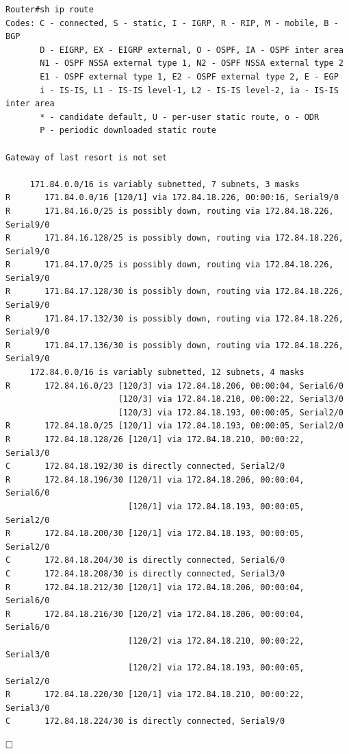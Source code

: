 \documentclass[11pt]{article}
\begin{document}
\begin{enumerate}
\begin{mdframed}
\begin{verbatim}
Router#sh ip route 
Codes: C - connected, S - static, I - IGRP, R - RIP, M - mobile, B - BGP
       D - EIGRP, EX - EIGRP external, O - OSPF, IA - OSPF inter area
       N1 - OSPF NSSA external type 1, N2 - OSPF NSSA external type 2
       E1 - OSPF external type 1, E2 - OSPF external type 2, E - EGP
       i - IS-IS, L1 - IS-IS level-1, L2 - IS-IS level-2, ia - IS-IS inter area
       * - candidate default, U - per-user static route, o - ODR
       P - periodic downloaded static route

Gateway of last resort is not set

     171.84.0.0/16 is variably subnetted, 7 subnets, 3 masks
R       171.84.0.0/16 [120/1] via 172.84.18.226, 00:00:16, Serial9/0
R       171.84.16.0/25 is possibly down, routing via 172.84.18.226, Serial9/0
R       171.84.16.128/25 is possibly down, routing via 172.84.18.226, Serial9/0
R       171.84.17.0/25 is possibly down, routing via 172.84.18.226, Serial9/0
R       171.84.17.128/30 is possibly down, routing via 172.84.18.226, Serial9/0
R       171.84.17.132/30 is possibly down, routing via 172.84.18.226, Serial9/0
R       171.84.17.136/30 is possibly down, routing via 172.84.18.226, Serial9/0
     172.84.0.0/16 is variably subnetted, 12 subnets, 4 masks
R       172.84.16.0/23 [120/3] via 172.84.18.206, 00:00:04, Serial6/0
                       [120/3] via 172.84.18.210, 00:00:22, Serial3/0
                       [120/3] via 172.84.18.193, 00:00:05, Serial2/0
R       172.84.18.0/25 [120/1] via 172.84.18.193, 00:00:05, Serial2/0
R       172.84.18.128/26 [120/1] via 172.84.18.210, 00:00:22, Serial3/0
C       172.84.18.192/30 is directly connected, Serial2/0
R       172.84.18.196/30 [120/1] via 172.84.18.206, 00:00:04, Serial6/0
                         [120/1] via 172.84.18.193, 00:00:05, Serial2/0
R       172.84.18.200/30 [120/1] via 172.84.18.193, 00:00:05, Serial2/0
C       172.84.18.204/30 is directly connected, Serial6/0
C       172.84.18.208/30 is directly connected, Serial3/0
R       172.84.18.212/30 [120/1] via 172.84.18.206, 00:00:04, Serial6/0
R       172.84.18.216/30 [120/2] via 172.84.18.206, 00:00:04, Serial6/0
                         [120/2] via 172.84.18.210, 00:00:22, Serial3/0
                         [120/2] via 172.84.18.193, 00:00:05, Serial2/0
R       172.84.18.220/30 [120/1] via 172.84.18.210, 00:00:22, Serial3/0
C       172.84.18.224/30 is directly connected, Serial9/0
\end{verbatim}
\end{mdframed}

    $\hfill\square$


\end{enumerate}
\end{document}
